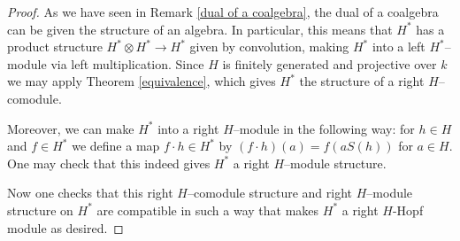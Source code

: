 \documentclass{article}
\theoremstyle{plain}
\theoremstyle{definition}
\begin{document}
\begin{proof}
As we have seen in Remark \ref{dual of a coalgebra}, the dual of a coalgebra can be given the structure of an algebra. In particular, this means that $H^*$ has a product structure $H^*\otimes H^* \to H^*$ given by convolution, making $H^*$ into a left $H^*$--module via left multiplication. Since $H$ is finitely generated and projective over $k$ we may apply Theorem \ref{equivalence}, which gives $H^*$ the structure of a right $H$--comodule. 

Moreover, we can make $H^*$ into a right $H$--module in the following way: for $h\in H$ and $f\in H^*$ we define a map $f \cdot h\in H^*$ by $(f\cdot h)(a)=f(aS(h))$ for $a\in H$. One may check that this indeed gives $H^*$ a right $H$--module structure.

Now one checks that this right $H$--comodule structure and right $H$--module structure on $H^*$ are compatible in such a way that makes $H^*$ a right $H$-Hopf module as desired.
\end{proof}
\end{document}
